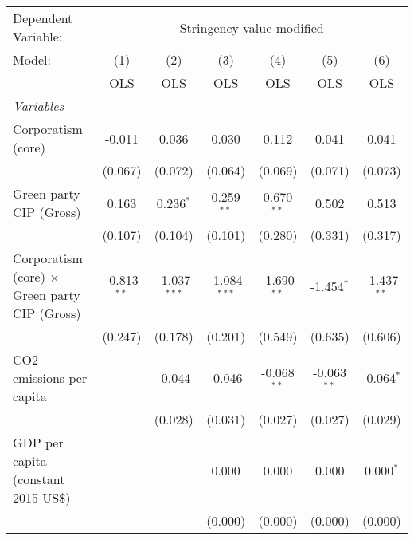 
\begingroup
\centering
\begin{tabular}{lcccccc}
   \toprule
   Dependent Variable: & \multicolumn{6}{c}{Stringency value modified}\\
   Model:                                               & (1)           & (2)            & (3)            & (4)           & (5)           & (6)\\  
                                                        &  OLS          & OLS            & OLS            & OLS           & OLS           & OLS\\  
   \midrule
   \emph{Variables}\\
   Corporatism (core)                                   & -0.011        & 0.036          & 0.030          & 0.112         & 0.041         & 0.041\\   
                                                        & (0.067)       & (0.072)        & (0.064)        & (0.069)       & (0.071)       & (0.073)\\   
   Green party CIP (Gross)                              & 0.163         & 0.236$^{*}$    & 0.259$^{**}$   & 0.670$^{**}$  & 0.502         & 0.513\\   
                                                        & (0.107)       & (0.104)        & (0.101)        & (0.280)       & (0.331)       & (0.317)\\   
   Corporatism (core) $\times$ Green party CIP (Gross)  & -0.813$^{**}$ & -1.037$^{***}$ & -1.084$^{***}$ & -1.690$^{**}$ & -1.454$^{*}$  & -1.437$^{**}$\\   
                                                        & (0.247)       & (0.178)        & (0.201)        & (0.549)       & (0.635)       & (0.606)\\   
   CO2 emissions per capita                             &               & -0.044         & -0.046         & -0.068$^{**}$ & -0.063$^{**}$ & -0.064$^{*}$\\   
                                                        &               & (0.028)        & (0.031)        & (0.027)       & (0.027)       & (0.029)\\   
   GDP per capita (constant 2015 US\$)                  &               &                & 0.000          & 0.000         & 0.000         & 0.000$^{*}$\\   
                                                        &               &                & (0.000)        & (0.000)       & (0.000)       & (0.000)\\   

\end{tabular}
